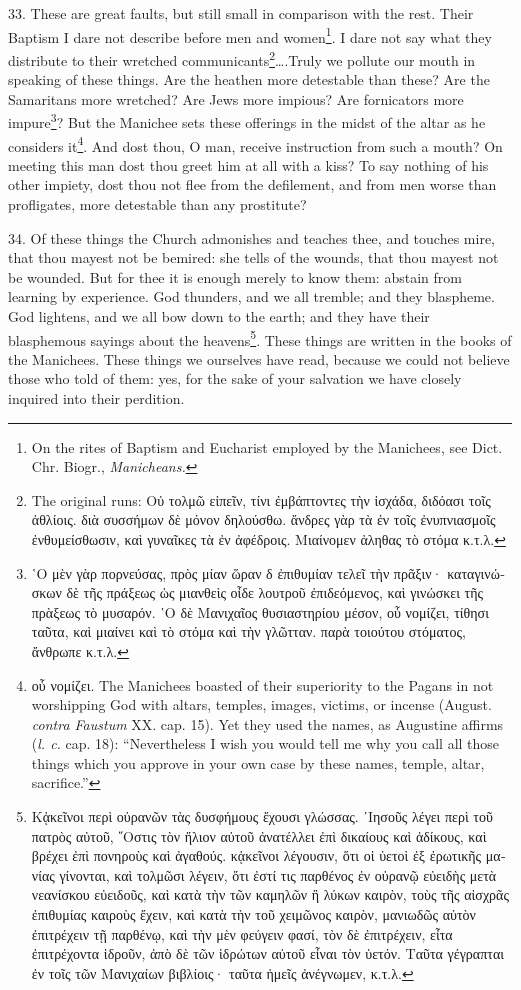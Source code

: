 33. These are great faults, but still small in comparison with the rest. Their Baptism I dare not describe before men and women\footnote{On the rites of Baptism and Eucharist employed by the Manichees, see Dict. Chr. Biogr., \emph{Manicheans.}}. I dare not say what they distribute to their wretched communicants\footnote{The original runs: \textgreek{Οὐ τολμῶ εἰπεῖν, τίνι ἐμβάπτοντες τὴν ἰσχάδα, διδόασι τοῖς ἀθλίοις. διὰ συσσήμων δὲ μόνον δηλούσθω. ἄνδρες γὰρ τὰ ἐν τοῖς ἐνυπνιασμοῖς ἐνθυμείσθωσιν, καὶ γυναῖκες τὰ ἐν ἀφέδροις. Μιαίνομεν ἀληθας τὸ στόμα κ.τ.λ}.}….Truly we pollute our mouth in speaking of these things. Are the heathen more detestable than these? Are the Samaritans more wretched? Are Jews more impious? Are fornicators more impure\footnote{\textgreek{῾Ο μὲν γὰρ πορνεύσας, πρὸς μίαν ὥραν δ ἐπιθυμίαν τελεῖ τὴν πρᾶξιν· καταγινώσκων δὲ τῆς πράξεως ὡς μιανθεὶς οἶδε λουτροῦ ἐπιδεόμενος, καὶ γινώσκει τῆς πρὰξεως τὸ μυσαρόν. ῾Ο δὲ Μανιχαῖος θυσιαστηρίου μέσον, οὗ νομίζει, τίθησι ταῦτα, καὶ μιαίνει καὶ τὸ στόμα καὶ τὴν γλῶτταν. παρὰ τοιούτου στόματος, ἄνθρωπε κ.τ.λ}.}? But the Manichee sets these offerings in the midst of the altar as he considers it\footnote{\textgreek{οὗ νομίζει}. The Manichees boasted of their superiority to the Pagans in not worshipping God with altars, temples, images, victims, or incense (August. \emph{contra Faustum} XX. cap. 15). Yet they used the names, as Augustine affirms (\emph{l. c.} cap. 18): “Nevertheless I wish you would tell me why you call all those things which you approve in your own case by these names, temple, altar, sacrifice.”}. And dost thou, O man, receive instruction from such a mouth? On meeting this man dost thou greet him at all with a kiss? To say nothing of his other impiety, dost thou not flee from the defilement, and from men worse than profligates, more detestable than any prostitute?

34. Of these things the Church admonishes and teaches thee, and touches mire, that thou mayest not be bemired: she tells of the wounds, that thou mayest not be wounded. But for thee it is enough merely to know them: abstain from learning by experience. God thunders, and we all tremble; and they blaspheme. God lightens, and we all bow down to the earth; and they have their blasphemous sayings about the heavens\footnote{\textgreek{Κᾀκεῖνοι περὶ οὐρανῶν τὰς δυσφήμους ἔχουσι γλώσσας. ᾽Ιησοῦς λέγει περὶ τοῦ πατρὸς αὐτοῦ, ῞Οστις τὸν ἥλιον αὐτοῦ ἀνατέλλει ἐπὶ δικαίους καὶ ἀδίκους, καὶ βρέχει ἐπὶ πονηροὺς καὶ ἀγαθούς. κᾀκεῖνοι λέγουσιν, ὅτι οἱ ὑετοὶ ἐξ ἐρωτικῆς μανίας γίνονται, καὶ τολμῶσι λέγειν, ὅτι ἐστί τις παρθένος ἐν οὐρανῷ εὐειδὴς μετὰ νεανίσκου εὐειδοῦς, καὶ κατὰ τὴν τῶν καμηλῶν ἢ λύκων καιρὸν, τοὺς τῆς αἰσχρᾶς ἐπιθυμίας καιροὺς ἔχειν, καὶ κατὰ τὴν τοῦ χειμῶνος καιρὸν, μανιωδῶς αὐτὸν ἐπιτρέχειν τῇ παρθένῳ, καὶ τὴν μὲν φεύγειν φασί, τὸν δὲ ἐπιτρέχειν, εἶτα ἐπιτρέχοντα ἱδροῦν, ἀπὸ δὲ τῶν ἱδρώτων αὐτοῦ εἶναι τὸν ὑετόν. Ταῦτα γέγραπται ἐν τοῖς τῶν Μανιχαίων βιβλίοις· ταῦτα ἡμεῖς ἀνέγνωμεν, κ.τ.λ}.}. These things are written in the books of the Manichees. These things we ourselves have read, because we could not believe those who told of them: yes, for the sake of your salvation we have closely inquired into their perdition.

